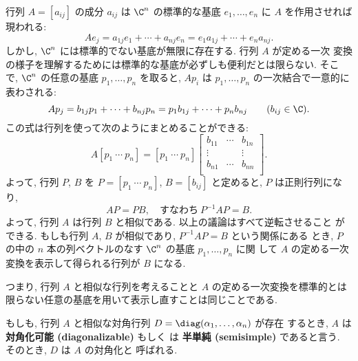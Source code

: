 \documentclass[12pt,twoside]{jarticle}
\begin{document}
行列 $A=[a_{ij}]$ の成分 $a_{ij}$ は $\C^n$ の標準的な基底 $e_1,\dots,e_n$ 
に $A$ を作用させれば現われる:
\begin{equation*}
  A e_j
  = a_{1j} e_1 + \cdots + a_{nj} e_n 
  = e_1 a_{1j} + \cdots + e_n a_{nj}.
\end{equation*}
しかし, $\C^n$ には標準的でない基底が無限に存在する.  行列 $A$ が定める一次
変換の様子を理解するためには標準的な基底が必ずしも便利だとは限らない.  そこ
で, $\C^n$ の任意の基底 $p_1,\dots,p_n$ を取ると, 
$A p_i$ は $p_1,\dots,p_n$ の一次結合で一意的に表わされる:
\begin{equation*}
    A p_j
  = b_{1j} p_1 + \cdots + b_{nj} p_n
  = p_1 b_{1j} + \cdots + p_n b_{nj}
  \qquad (b_{ij}\in\C).
\end{equation*}
この式は行列を使って次のようにまとめることができる:
\begin{equation*}
  A [p_1\ \cdots\ p_n]
  =
  [p_1\ \cdots\ p_n]
  \begin{bmatrix}
    b_{11} & \cdots & b_{1n} \\
    \vdots &        & \vdots \\
    b_{n1} & \cdots & b_{nn} \\
  \end{bmatrix}.
\end{equation*}
よって, 行列 $P$, $B$ を $P=[p_1\ \cdots\ p_n]$, $B = [b_{ij}]$ と定めると,
$P$ は正則行列になり,
\begin{equation*}
  AP = PB, \quad \text{すなわち}\  P^{-1}AP=B.
\end{equation*}
よって, 行列 $A$ は行列 $B$ と相似である.  以上の議論はすべて逆転させること
ができる.  もしも行列 $A$, $B$ が相似であり,  $P^{-1}AP=B$ という関係にある
とき, $P$ の中の $n$ 本の列ベクトルのなす $\C^n$ の基底 $p_1,\dots,p_n$ に関
して $A$ の定める一次変換を表示して得られる行列が $B$ になる.

つまり, 行列 $A$ と相似な行列を考えることと $A$ の定める一次変換を標準的とは
限らない任意の基底を用いて表示し直すことは同じことである.

もしも, 行列 $A$ と相似な対角行列 $D=\diag(\alpha_1,\dots,\alpha_n)$ が存在
するとき, $A$ は{\bf 対角化可能 (diagonalizable)} もしく
は {\bf 半単純 (semisimple)} であると言う.  そのとき, $D$ は $A$ の対角化と
呼ばれる. 
\end{document}
